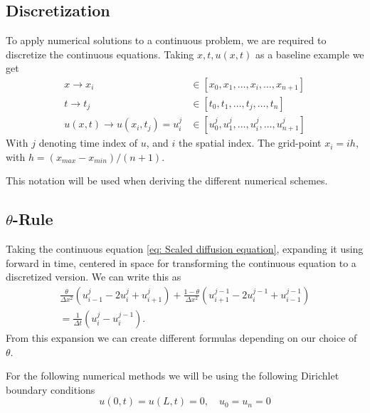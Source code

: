 \documentclass[%
reprint,
nofootinbib,
amsmath,amssymb,
aps,
]{revtex4-1}
\begin{document}
\subsection{Discretization}
To apply numerical solutions to a continuous problem, we are required to discretize the continuous equations. Taking $x, t, u(x,t)$ as a baseline example we get 
\begin{equation}
	\begin{split}
		x \rightarrow x_i &\in [x_0,x_1,\dots,x_i,\dots,x_{n+1}]\\		
		t \rightarrow t_j &\in [t_0,t_1,\dots,t_j,\dots,t_{n}]\\
		u(x,t)\rightarrow u(x_i,t_j) = u_i^j &\in [u_0^j,u_1^j,\dots,u_i^j,\dots,u_{n+1}^j]
	\end{split}
\end{equation}
With $j$ denoting time index of $u$, and $i$ the spatial index. 
The grid-point $x_i = ih$, with $h = (x_{max} - x_{min})/(n+1)$. 

This notation will be used when deriving the different numerical schemes. 
\subsection{$\theta$-Rule}
Taking the continuous equation \eqref{eq: Scaled diffusion equation}, expanding it using forward in time, centered in space for transforming the continuous equation to a discretized version. We can write this as 
\begin{equation}\label{eq theta}
	\begin{split}
			\frac{\theta}{\Delta x^2}\left(u_{i-1}^j - 2u_i^j +  u_{i+1}^j\right) + \frac{1 - \theta}{\Delta x^2}\left(u_{i+1}^{j-1} - 2u_i^{j-1} + u_{i-1}^{j-1}\right)\\
			 = \frac{1}{\Delta t}\left(u_i^j - u_i^{j-1}\right).
	\end{split}
\end{equation}
From this expansion we can create different formulas depending on our choice of $\theta$.

For the following numerical methods we will be using the following Dirichlet boundary conditions
\begin{equation}
	u(0,t) = u(L,t) = 0, \quad u_0 = u_n = 0
\end{equation}
\end{document}
